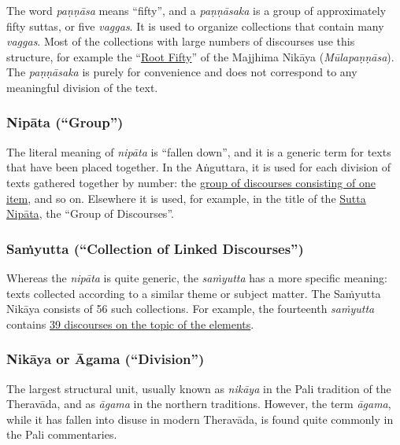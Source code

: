\documentclass[12pt,openany]{book}%
\begin{document}
The word \textit{\textsanskrit{paṇṇāsa}} means “fifty”, and a \textit{\textsanskrit{paṇṇāsaka}} is a group of approximately fifty suttas, or five \textit{vaggas}. It is used to organize collections that contain many \textit{vaggas}. Most of the collections with large numbers of discourses use this structure, for example the “\href{https://suttacentral.net/mn-mulapannasa}{Root Fifty}” of the Majjhima \textsanskrit{Nikāya} (\textit{\textsanskrit{Mūlapaṇṇāsa}}). The \textit{\textsanskrit{paṇṇāsaka}} is purely for convenience and does not correspond to any meaningful division of the text.

\subsubsection*{\textsanskrit{Nipāta} (“Group”)}

The literal meaning of \textit{\textsanskrit{nipāta}} is “fallen down”, and it is a generic term for texts that have been placed together. In the \textsanskrit{Aṅguttara}, it is used for each division of texts gathered together by number: the \href{https://suttacentral.net/an1}{group of discourses consisting of one item}, and so on. Elsewhere it is used, for example, in the title of the \href{https://suttacentral.net/snp" class="text-root}{Sutta Nipāta}, the “Group of Discourses”.

\subsubsection*{\textsanskrit{Saṁyutta} (“Collection of Linked Discourses”)}

Whereas the \textit{\textsanskrit{nipāta}} is quite generic, the \textit{\textsanskrit{saṁyutta}} has a more specific meaning: texts collected according to a similar theme or subject matter. The \textsanskrit{Saṁyutta} \textsanskrit{Nikāya} consists of 56 such collections. For example, the fourteenth \textit{\textsanskrit{saṁyutta}} contains \href{https://suttacentral.net/sn14}{39 discourses on the topic of the elements}.

\subsubsection*{\textsanskrit{Nikāya} or Āgama (“Division”)}

The largest structural unit, usually known as \textit{\textsanskrit{nikāya}} in the Pali tradition of the \textsanskrit{Theravāda}, and as \textit{\textsanskrit{āgama}} in the northern traditions. However, the term \textit{\textsanskrit{āgama}}, while it has fallen into disuse in modern \textsanskrit{Theravāda}, is found quite commonly in the Pali commentaries.
\end{document}
